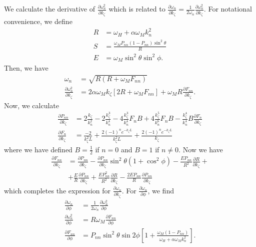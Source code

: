 \documentclass{article}
\begin{document}
We calculate the derivative of $\frac{\partial \omega_{n}^2}{\partial k_{\zeta}}$ which is related to $\frac{\partial \omega_{n}}{\partial k_{\zeta}} = \frac{1}{2 \omega_{n}} \frac{\partial \omega_{n}^2}{\partial k_{\zeta}}$. For notational convenience, we define 
\begin{align}
R &= \omega_{H} + \alpha \omega_{M} k_{n}^2 \\
S &= \frac{\omega_{M} P_{nn} (1 - P_{nn}) \sin^2{\theta}}{R} \\
E &= \omega_{M} \sin^2{\theta} \sin^2{\phi}.
\end{align}
Then, we have
\begin{align}
\omega_{n} &= \sqrt{R(R + \omega_{M} F_{nn})} \\
\frac{\partial \omega_{n}^2}{\partial k_{\zeta}} &= 2  \alpha \omega_{M} k_{\zeta} \left[2R + \omega_{M} F_{nn} \right] + \omega_{M} R \frac{\partial F_{nn}}{\partial k_{\zeta}}.
\end{align}
Now, we calculate
\begin{align}
\frac{\partial P_{nn}}{\partial k_{\zeta}} &= 2 \frac{k_{\zeta}}{k_{n}^{2}} - 2 \frac{k_{\zeta}^3}{k_{n}^{4}} - 4 \frac{k_{\zeta}^3}{k_{n}^{4}}   F_{n} B + 4 \frac{k_{\zeta}^5}{k_{n}^{6}} F_{n} B - \frac{k_{\zeta}^4}{k_{n}^{4}} B \frac{\partial F_{n}}{\partial k_{\zeta}} \\
\frac{\partial F_{n}}{\partial k_{\zeta}} &= \frac{-2}{k_{\zeta}^2 L} + \frac{2 (-1)^n e^{-k_{\zeta} L}}{k_{\zeta}^2 L} + \frac{2 (-1)^n e^{-k_{\zeta} L}}{k_{\zeta}}
\end{align}
where we have defined $B = \frac{1}{2}$ if $n=0$ and $B=1$ if $n \neq 0$.
Now we have
\begin{align}
\frac{\partial F_{nn}}{\partial k_{\zeta}} &= \frac{\partial P_{nn}}{\partial k_{\zeta}} - \frac{\partial P_{nn}}{\partial k_{\zeta}} \sin^2{\theta} (1 + \cos^2{\phi}) - \frac{E P_{nn}}{R^2} \frac{\partial R}{\partial k_{\zeta}} + \\
&+ \frac{E}{R} \frac{\partial P_{nn}}{\partial k_{\zeta}}  + \frac{E P_{nn}^2}{R^2} \frac{\partial R}{\partial k_{\zeta}} - \frac{2 E P_{nn}}{R} \frac{\partial P_{nn}}{\partial k_{\zeta}} \nonumber
\end{align}
which completes the expression for $\frac{\partial \omega_{n}}{\partial k_{\zeta}}$. For $\frac{\partial \omega_{n}}{\partial \phi}$, we find
\begin{align}
\frac{\partial \omega_{n}}{\partial \phi} &= \frac{1}{2 \omega_{n}} \frac{\partial \omega_{n}^2}{\partial \phi} \\
\frac{\partial \omega_{n}^2}{\partial \phi} &= R \omega_{M} \frac{\partial F_{nn}}{\partial \phi} \\
\frac{\partial F_{nn}}{\partial \phi} &= P_{nn} \sin^2{\theta} \sin{2\phi} \left[ 1 + \frac{\omega_{M} (1 - P_{nn})}{\omega_{H} + \alpha \omega_{M} k_{n}^2} \right].
\end{align}
\end{document}
